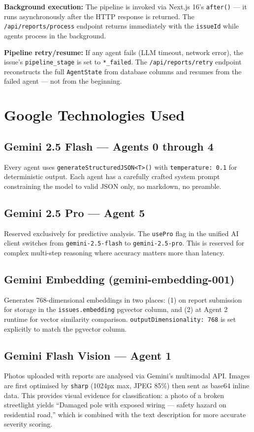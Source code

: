 \documentclass[11pt,a4paper]{article}
\newcommand{\tech}[1]{\texttt{\color{cpteal}#1}}
\newcommand{\file}[1]{\texttt{\footnotesize\color{cpgray}#1}}
\begin{document}
\textbf{Background execution:} The pipeline is invoked via Next.js 16's \tech{after()} — it runs asynchronously after the HTTP response is returned. The \file{/api/reports/process} endpoint returns immediately with the \tech{issueId} while agents process in the background.

\textbf{Pipeline retry/resume:} If any agent fails (LLM timeout, network error), the issue's \tech{pipeline\_stage} is set to \tech{*\_failed}. The \file{/api/reports/retry} endpoint reconstructs the full \tech{AgentState} from database columns and resumes from the failed agent — not from the beginning.

\clearpage

\section{Google Technologies Used}
\label{sec:google}

\subsection{Gemini 2.5 Flash — Agents 0 through 4}
Every agent uses \tech{generateStructuredJSON<T>()} with \tech{temperature: 0.1} for deterministic output. Each agent has a carefully crafted system prompt constraining the model to valid JSON only, no markdown, no preamble.

\subsection{Gemini 2.5 Pro — Agent 5}
Reserved exclusively for predictive analysis. The \tech{usePro} flag in the unified AI client switches from \tech{gemini-2.5-flash} to \tech{gemini-2.5-pro}. This is reserved for complex multi-step reasoning where accuracy matters more than latency.

\subsection{Gemini Embedding (gemini-embedding-001)}
Generates 768-dimensional embeddings in two places: (1) on report submission for storage in the \tech{issues.embedding} pgvector column, and (2) at Agent 2 runtime for vector similarity comparison. \tech{outputDimensionality: 768} is set explicitly to match the pgvector column.

\subsection{Gemini Flash Vision — Agent 1}
Photos uploaded with reports are analysed via Gemini's multimodal API. Images are first optimised by \tech{sharp} (1024px max, JPEG 85\%) then sent as base64 inline data. This provides visual evidence for classification: a photo of a broken streetlight yields ``Damaged pole with exposed wiring — safety hazard on residential road,'' which is combined with the text description for more accurate severity scoring.
\end{document}
